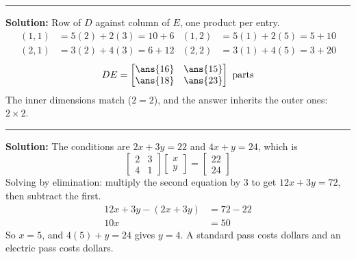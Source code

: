 \documentclass[12pt]{article}
\begin{document}
\vspace{0.2cm}\noindent\rule{\linewidth}{0.2pt}


\textbf{Solution:} Row of $D$ against column of $E$, one product per entry.
\begin{align*}
  (1,1) &= 5(2) + 2(3) = 10 + 6 &  (1,2) &= 5(1) + 2(5) = 5 + 10 \\
  (2,1) &= 3(2) + 4(3) = 6 + 12 &  (2,2) &= 3(1) + 4(5) = 3 + 20
\end{align*}
\[ DE = \begin{bmatrix} \ans{16} & \ans{15} \\ \ans{18} & \ans{23} \end{bmatrix} \text{ parts} \]
The inner dimensions match ($2 = 2$), and the answer inherits the outer ones: $2 \times 2$.

\vspace{0.2cm}\noindent\rule{\linewidth}{0.2pt}


\textbf{Solution:} The conditions are $2x + 3y = 22$ and $4x + y = 24$, which is
\[ \begin{bmatrix} 2 & 3 \\ 4 & 1 \end{bmatrix}
   \begin{bmatrix} x \\ y \end{bmatrix}
   = \begin{bmatrix} 22 \\ 24 \end{bmatrix} \]
Solving by elimination: multiply the second equation by $3$ to get $12x + 3y = 72$, then
subtract the first.
\begin{align*}
  12x + 3y - (2x + 3y) &= 72 - 22 \\
  10x &= 50
\end{align*}
So $x = 5$, and $4(5) + y = 24$ gives $y = 4$. A standard pass costs  dollars and
an electric pass costs  dollars.
\end{document}
